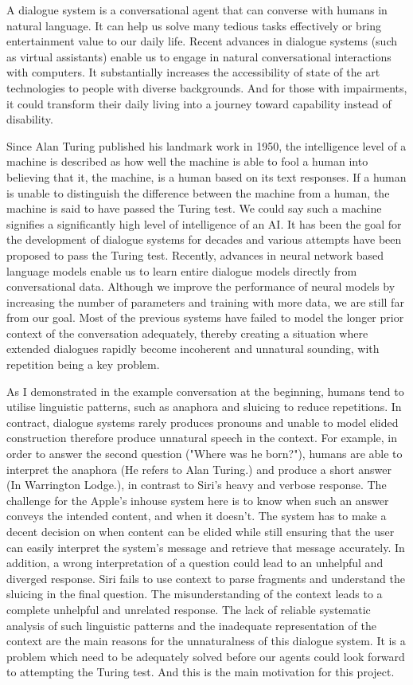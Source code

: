 \documentclass[bsc,frontabs,twoside,singlespacing,parskip,deptreport]{infthesis}     %
\begin{document}
A dialogue system is a conversational agent that can converse with humans in natural language. It can help us solve many tedious tasks effectively or bring entertainment value to our daily life. Recent advances in dialogue systems (such as virtual assistants\cite{alexa,cortana,siri}) enable us to engage in natural conversational interactions with computers. It substantially increases the accessibility of state of the art technologies to people with diverse backgrounds. And for those with impairments, it could transform their daily living into a journey toward capability instead of disability.

Since Alan Turing published his landmark work in 1950\cite{turing1950computing}, the intelligence level of a machine is described as how well the machine is able to fool a human into believing that it, the machine, is a human based on its text responses. If a human is unable to distinguish the difference between the machine from a human, the machine is said to have passed the Turing test. We could say such a machine signifies a significantly high level of intelligence of an AI. It has been the goal for the development of dialogue systems for decades and various attempts have been proposed to pass the Turing test. Recently, advances in neural network based language models enable us to learn entire dialogue models directly from conversational data. Although we improve the performance of neural models by increasing the number of parameters and training with more data, we are still far from our goal. Most of the previous systems have failed to model the longer prior context of the conversation adequately, thereby creating a situation where extended dialogues rapidly become incoherent and unnatural sounding, with repetition being a key problem. 

As I demonstrated in the example conversation at the beginning, humans tend to utilise linguistic patterns, such as anaphora and sluicing to reduce repetitions. In contract, dialogue systems rarely produces pronouns and unable to model elided construction therefore produce unnatural speech in the context. For example, in order to answer the second question ("Where was he born?"), humans are able to interpret the anaphora (He refers to Alan Turing.) and produce a short answer (In Warrington Lodge.), in contrast to Siri's heavy and verbose response. The challenge for the Apple's inhouse system here is to know when such an answer conveys the intended content, and when it doesn't. The system has to make a decent decision on when content can be elided while still ensuring that the user can easily interpret the system's message and retrieve that message accurately. In addition, a wrong interpretation of a question could lead to an unhelpful and diverged response. Siri fails to use context to parse fragments and understand the sluicing in the final question. The misunderstanding of the context leads to a complete unhelpful and unrelated response. The lack of reliable systematic analysis of such linguistic patterns and the inadequate representation of the context are the main reasons for the unnaturalness of this dialogue system. It is a problem which need to be adequately solved before our agents could look forward to attempting the Turing test. And this is the main motivation for this project.
\end{document}
